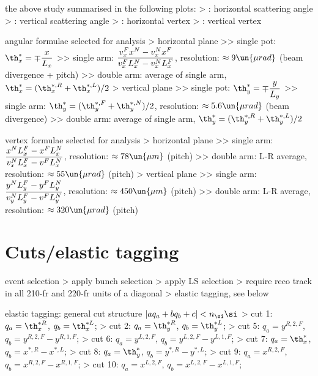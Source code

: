 \> the above study summarised in the following plots:
\>> : horizontal scattering angle
\>> : vertical scattering angle
\>> : horizontal vertex
\>> : vertical vertex

\iffalse
\> \plot{reconstruction_formulae/plot_formulae_correlation.pdf} : study of left-right correlations of angle reconstruction errors
\>> significant in $x$ due to neglecting $x^*$
\fi

\> angular formulae selected for analysis
\>> horizontal plane
\>>> single pot: $\displaystyle \th_x^{*} = \mp {x\over L_x}$
\>>> single arm: $\displaystyle {v_x^F x^N - v_x^N x^F\over v_x^F L_x^N - v_x^N L_x^F}$, resolution: $\approx 9\un{\mu rad}$ (beam divergence + pitch)
\>>> double arm: average of single arm, $\th_x^* = (\th_x^{*,R} + \th_x^{*,L}) / 2$
\>> vertical plane
\>>> single pot: $\displaystyle \th_y^{*} = \mp {y\over L_y}$
\>>> single arm: $\displaystyle \th_y^{*} = (\th_y^{*,F} + \th_y^{*,N}) / 2$, resolution: $\approx 5.6\un{\mu rad}$ (beam divergence)
\>>> double arm: average of single arm, $\th_y^* = (\th_y^{*,R} + \th_y^{*,L}) / 2$

\> vertex formulae selected for analysis
\>> horizontal plane
\>>> single arm: $\displaystyle {x^N L_x^F - x^F L_x^N\over v_x^N L_x^F - v^F L_x^N}$, resolution: $\approx 78\un{\mu m}$ (pitch)
\>>> double arm: L-R average, resolution: $\approx 55\un{\mu rad}$ (pitch)
\>> vertical plane
\>>> single arm: $\displaystyle {y^N L_y^F - y^F L_y^N\over v_y^N L_y^F - v^F L_y^N}$, resolution: $\approx 450\un{\mu m}$ (pitch)
\>>> double arm: L-R average, resolution: $\approx 320\un{\mu rad}$ (pitch)




\chapter[cuts]{Cuts/elastic tagging}

\> event selection
\>> apply bunch selection
\>> apply LS selection
\>> require reco track in all 210-fr and 220-fr units of a diagonal
\>> elastic tagging, see below

\> elastic tagging: general cut structure $| a q_a + b q_b + c| < n_\si  \si$
\>> cut 1: $q_a = \th_x^{*R}$, $q_b = \th_x^{*L}$; 
\>> cut 2: $q_a = \th_y^{*R}$, $q_b = \th_y^{*L}$; 
\>> cut 5: $q_a = y^{R,2,F}$, $q_b = y^{R,2,F} - y^{R,1,F}$; 
\>> cut 6: $q_a = y^{L,2,F}$, $q_b = y^{L,2,F} - y^{L,1,F}$; 
\>> cut 7: $q_a = \th^*_{x}$, $q_b = x^{*,R} - x^{*,L}$; 
\>> cut 8: $q_a = \th^*_{y}$, $q_b = y^{*,R} - y^{*,L}$; 
\>> cut 9: $q_a = x^{R,2,F}$, $q_b = x^{R,2,F} - x^{R,1,F}$; 
\>> cut 10: $q_a = x^{L,2,F}$, $q_b = x^{L,2,F} - x^{L,1,F}$; 

